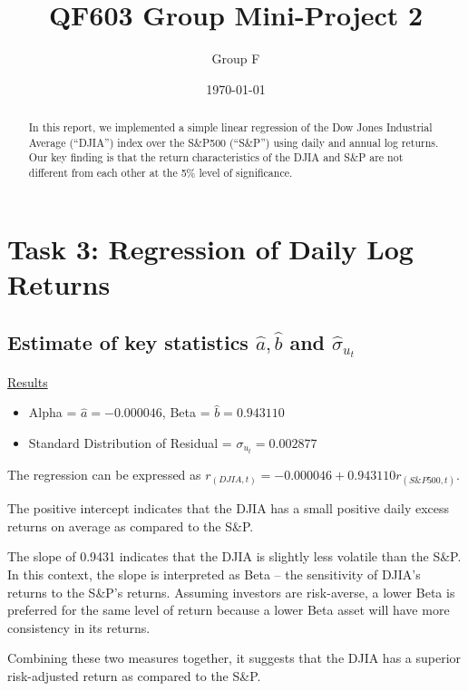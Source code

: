 \documentclass[a4paper]{article}
\title{QF603 Group Mini-Project 2}
\author{Group F}
\date{\today}
\begin{document}
	\maketitle
	
	\begin{abstract}
		In this report, we implemented a simple linear regression of the Dow Jones Industrial Average (“DJIA”) index over the S\&P500 (“S\&P”) using daily and annual log returns. 
		Our key finding is that the return characteristics of the DJIA and S\&P are not different from each other at the 5\% level of significance. 	
	\end{abstract} 
	
	\newpage
	\setcounter{secnumdepth}{1}
	\section*{Task 3: Regression of Daily Log Returns}
	\label{sec:introduction}
	
	\subsection{Estimate of key statistics $\hat{a},\hat{b}$ and $\hat{\sigma}_{u_t}$}
	\underline{Results}
	\begin{itemize}[nosep]
		\item Alpha = $\hat{a} = -0.000046$, Beta = $\hat{b} = 0.943110$
		\item Standard Distribution of Residual = $\sigma_{u_t} = 0.002877$
	\end{itemize}

	The regression can be expressed as $r_{(DJIA, t)} = -0.000046 +  0.943110 r_{(S\&P500, t)}$.
	
	The positive intercept indicates that the DJIA has a small positive daily excess returns on average as compared to the S\&P. 
	
	The slope of 0.9431 indicates that the DJIA is slightly less volatile than the S\&P. In this context, the slope is interpreted as Beta – the sensitivity of DJIA’s returns to the S\&P’s returns. Assuming investors are risk-averse, a lower Beta is preferred for the same level of return because a lower Beta asset will have more consistency in its returns.
	  
	Combining these two measures together, it suggests that the DJIA has a superior risk-adjusted return as compared to the S\&P. 
	
	
\end{document}
